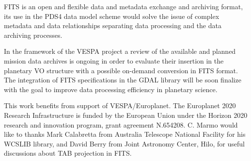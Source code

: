 FITS is an open and flexible data and metadata exchange and archiving format, its use
in the PDS4 data model scheme would solve the issue of complex
metadata and data relationships separating data processing and the data archiving processes.

In the framework of the VESPA project a review of the available and planned mission data
archives is ongoing in order to evaluate their insertion in the planetary VO structure
with a possible on-demand conversion in FITS format.
The integration of FITS specifications in the GDAL library will be soon finalize with the goal to
improve data processing efficiency in planetary science.


%
%
%
%

%

%

%

\acknowledgments
This work benefits from support of VESPA/Europlanet.
The Europlanet 2020 Research Infrastructure is funded by the European Union
under the Horizon 2020 research and innovation program, grant agreement N.654208.
C. Marmo would like to thanks Mark Calabretta from Australia Telescope National Facility
for his WCSLIB library, and David Berry from Joint Astronomy Center, Hilo, for useful
discussions about TAB projection in FITS.

